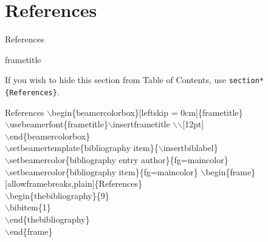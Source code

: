 \section{References}


\begin{frame}{References}
    
    \begin{beamercolorbox}[leftskip = 0cm]{frametitle}
        \insertframetitle\\[12pt]
    \end{beamercolorbox}
    If you wish to hide this section from Table of Contents, use \texttt{section*\{References\}}.
    \begin{block}{References}
        $\backslash$begin\{beamercolorbox\}[leftskip = $0$cm]\{frametitle\} \\
            $\backslash$usebeamerfont\{frametitle\}$\backslash$insertframetitle $\backslash$$\backslash$[12pt] \\
        $\backslash$end\{beamercolorbox\} \\
        $\backslash$setbeamertemplate\{bibliography item\}\{$\backslash$insertbiblabel\}\\
        $\backslash$setbeamercolor\{bibliography entry author\}\{fg=maincolor\}\\
        $\backslash$setbeamercolor\{bibliography item\}\{fg=maincolor\}
        $\backslash$begin\{frame\}[allowframebreaks,plain]\{References\}\\
            $\backslash$begin\{thebibliography\}\{9\}\\
                $\backslash$bibitem\{1\} \\
            $\backslash$end\{thebibliography\}   \\
        $\backslash$end\{frame\}
    \end{block}

    
    
\end{frame}